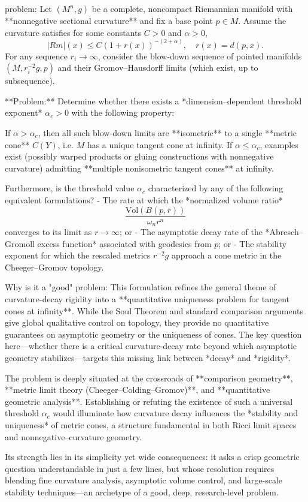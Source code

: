 problem:  
Let \((M^n, g)\) be a complete, noncompact Riemannian manifold with **nonnegative sectional curvature** and fix a base point \(p \in M\).  
Assume the curvature satisfies for some constants \(C>0\) and \(\alpha>0\),
\[
|Rm|(x) \le C (1+r(x))^{-(2+\alpha)}, \quad r(x) = d(p, x).
\]  
For any sequence \(r_i \to \infty\), consider the blow-down sequence of pointed manifolds \((M, r_i^{-2} g, p)\) and their Gromov–Hausdorff limits (which exist, up to subsequence).  

**Problem:**  
Determine whether there exists a *dimension–dependent threshold exponent* \(\alpha_c > 0\) with the following property:

If \(\alpha > \alpha_c\), then all such blow-down limits are **isometric** to a single **metric cone** \(C(Y)\), i.e. \(M\) has a unique tangent cone at infinity.  
If \(\alpha \le \alpha_c\), examples exist (possibly warped products or gluing constructions with nonnegative curvature) admitting **multiple nonisometric tangent cones** at infinity.  

Furthermore, is the threshold value \(\alpha_c\) characterized by any of the following equivalent formulations?  
- The rate at which the *normalized volume ratio*
  \[
  \frac{\mathrm{Vol}(B(p,r))}{\omega_n r^n}
  \]
  converges to its limit as \(r\to\infty\); or  
- The asymptotic decay rate of the *Abresch–Gromoll excess function* associated with geodesics from \(p\); or  
- The stability exponent for which the rescaled metrics \(r^{-2}g\) approach a cone metric in the Cheeger–Gromov topology.

Why is it a "good" problem:  
This formulation refines the general theme of curvature-decay rigidity into a **quantitative uniqueness problem for tangent cones at infinity**.  
While the Soul Theorem and standard comparison arguments give global qualitative control on topology, they provide no quantitative guarantees on asymptotic geometry or the uniqueness of cones. The key question here—whether there is a critical curvature-decay rate beyond which asymptotic geometry stabilizes—targets this missing link between *decay* and *rigidity*.  

The problem is deeply situated at the crossroads of **comparison geometry**, **metric limit theory (Cheeger–Colding–Gromov)**, and **quantitative geometric analysis**. Establishing or refuting the existence of such a universal threshold \(\alpha_c\) would illuminate how curvature decay influences the *stability and uniqueness* of metric cones, a structure fundamental in both Ricci limit spaces and nonnegative–curvature geometry.  

Its strength lies in its simplicity yet wide consequences: it asks a crisp geometric question understandable in just a few lines, but whose resolution requires blending fine curvature analysis, asymptotic volume control, and large-scale stability techniques—an archetype of a good, deep, research-level problem.